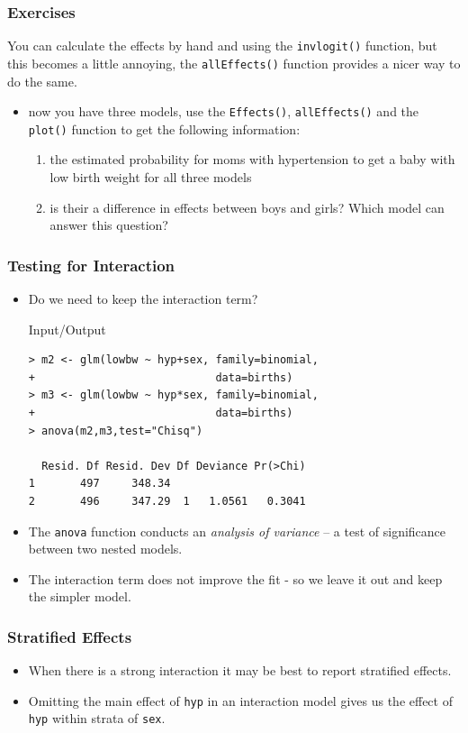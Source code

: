 \begin{frame}[fragile]\frametitle{Exercises}
You can calculate the effects by hand and using the \texttt{invlogit()} function, but this becomes a little annoying, the \texttt{allEffects()} function provides a nicer way to do the same.
\begin{itemize}
\item now you have three models, use the \texttt{Effects()}, \texttt{allEffects()} and the \texttt{plot()} function to get the following information:
  \begin{enumerate}
  \item the estimated probability for moms with hypertension to get a baby with low birth weight for all three models
  \item is their a difference in effects between boys and girls? Which model can answer this question?
  \end{enumerate}
\end{itemize}
\end{frame}


\begin{frame}[fragile]\frametitle{Testing for Interaction}
\begin{itemize}
\item Do we need to keep the interaction term? \footnotesize
  \begin{exampleblock}{Input/Output}
\begin{verbatim}
> m2 <- glm(lowbw ~ hyp+sex, family=binomial, 
+                            data=births)
> m3 <- glm(lowbw ~ hyp*sex, family=binomial, 
+                            data=births)
> anova(m2,m3,test="Chisq")

  Resid. Df Resid. Dev Df Deviance Pr(>Chi)
1       497     348.34                     
2       496     347.29  1   1.0561   0.3041
\end{verbatim}
  \end{exampleblock}
\normalsize
\item The \texttt{anova} function conducts an \emph{analysis of variance} -- a test of significance between two nested models. 
\item The interaction term does not improve the fit - so we leave it out and keep the simpler model.
\end{itemize}
\end{frame}


\begin{frame}[fragile]\frametitle{Stratified Effects}
\begin{itemize}
\item When there is a strong interaction it may be best to report stratified effects. 
\item Omitting the main effect of \texttt{hyp} in an interaction model gives us the effect of \texttt{hyp} within strata of \texttt{sex}.\scriptsize
\end{itemize}
\end{frame}

